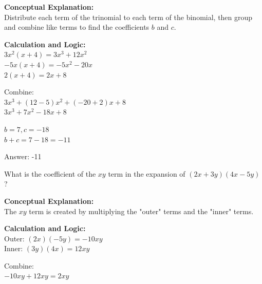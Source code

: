 \documentclass[11pt,paper=a4,answers]{exam}
\begin{document}
\begin{questions}
\begin{solution}
\textbf{Conceptual Explanation:} \\
Distribute each term of the trinomial to each term of the binomial, then group and combine like terms to find the coefficients $b$ and $c$.

\vspace{20pt}

\textbf{Calculation and Logic:} \\
$3x^2(x + 4) = 3x^3 + 12x^2$ \\
$-5x(x + 4) = -5x^2 - 20x$ \\
$2(x + 4) = 2x + 8$

\vspace{10pt}

Combine: \\
$3x^3 + (12 - 5)x^2 + (-20 + 2)x + 8$ \\
$3x^3 + 7x^2 - 18x + 8$

\vspace{10pt}

$b = 7, c = -18$ \\
$b + c = 7 - 18 = -11$

\vspace{25pt}

Answer: \colorbox{yellow!100}{-11}
\end{solution}

\vspace{40pt}

\question
What is the coefficient of the $xy$ term in the expansion of $(2x + 3y)(4x - 5y)$?

\begin{solution}
\textbf{Conceptual Explanation:} \\
The $xy$ term is created by multiplying the "outer" terms and the "inner" terms.

\vspace{20pt}

\textbf{Calculation and Logic:} \\
Outer: $(2x)(-5y) = -10xy$ \\
Inner: $(3y)(4x) = 12xy$

\vspace{10pt}

Combine: \\
$-10xy + 12xy = 2xy$

\vspace{10pt}


\end{solution}
\end{questions}
\end{document}
